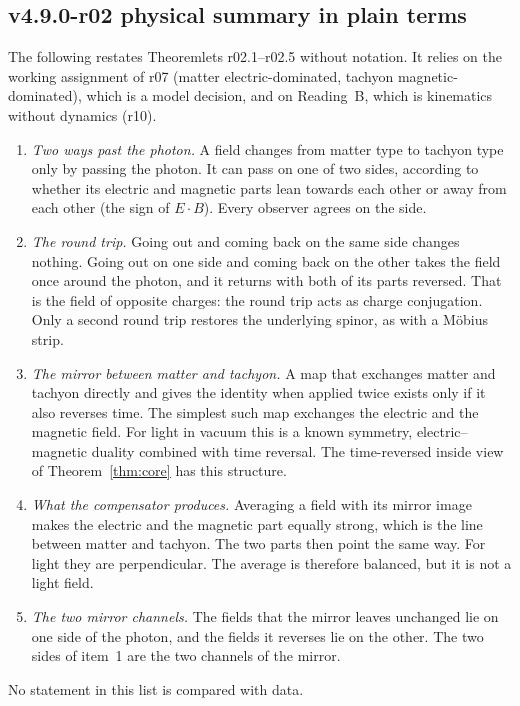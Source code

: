\subsection*{v4.9.0-r02 physical summary in plain terms}
\label{subsec:v490-r02-plain}

The following restates Theoremlets r02.1--r02.5 without notation.  It relies on the working assignment of r07
(matter electric-dominated, tachyon magnetic-dominated), which is a model decision, and on Reading~B, which is
kinematics without dynamics (r10).
\begin{enumerate}[leftmargin=2em]
\item \emph{Two ways past the photon.}  A field changes from matter type to tachyon type only by passing the photon.  It
can pass on one of two sides, according to whether its electric and magnetic parts lean towards each other or away from
each other (the sign of \(E\cdot B\)).  Every observer agrees on the side.
\item \emph{The round trip.}  Going out and coming back on the same side changes nothing.  Going out on one side and
coming back on the other takes the field once around the photon, and it returns with both of its parts reversed.  That
is the field of opposite charges: the round trip acts as charge conjugation.  Only a second round trip restores the
underlying spinor, as with a M\"obius strip.
\item \emph{The mirror between matter and tachyon.}  A map that exchanges matter and tachyon directly and gives the
identity when applied twice exists only if it also reverses time.  The simplest such map exchanges the electric and the
magnetic field.  For light in vacuum this is a known symmetry, electric--magnetic duality combined with time reversal.
The time-reversed inside view of Theorem~\ref{thm:core} has this structure.
\item \emph{What the compensator produces.}  Averaging a field with its mirror image makes the electric and the
magnetic part equally strong, which is the line between matter and tachyon.  The two parts then point the same way.
For light they are perpendicular.  The average is therefore balanced, but it is not a light field.
\item \emph{The two mirror channels.}  The fields that the mirror leaves unchanged lie on one side of the photon, and
the fields it reverses lie on the other.  The two sides of item~1 are the two channels of the mirror.
\end{enumerate}
No statement in this list is compared with data.


